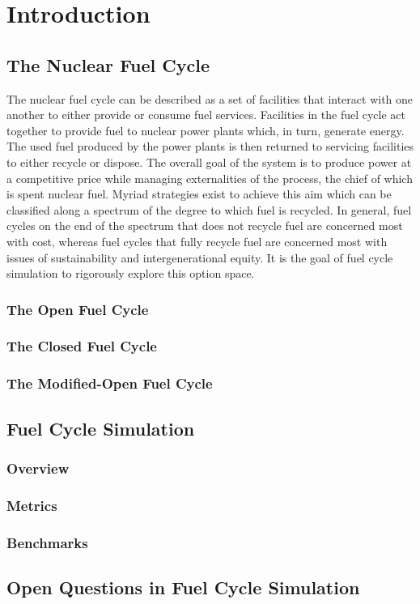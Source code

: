 \chapter{Introduction}\label{ch:intro}

\section{The Nuclear Fuel Cycle}

The nuclear fuel cycle can be described as a set of facilities that interact
with one another to either provide or consume fuel services. Facilities in the
fuel cycle act together to provide fuel to nuclear power plants which, in turn,
generate energy. The used fuel produced by the power plants is then returned to
servicing facilities to either recycle or dispose. The overall goal of the
system is to produce power at a competitive price while managing externalities
of the process, the chief of which is spent nuclear fuel. Myriad strategies
exist to achieve this aim which can be classified along a spectrum of the degree
to which fuel is recycled. In general, fuel cycles on the end of the spectrum
that does not recycle fuel are concerned most with cost, whereas fuel cycles
that fully recycle fuel are concerned most with issues of sustainability and
intergenerational equity. It is the goal of fuel cycle simulation to rigorously
explore this option space.

\subsection{The Open Fuel Cycle}


\subsection{The Closed Fuel Cycle}


\subsection{The Modified-Open Fuel Cycle}


\section{Fuel Cycle Simulation}

\subsection{Overview}\label{sec:simulators-overview}


\subsection{Metrics}


\subsection{Benchmarks}\label{sec:intro-benchmarks}


\section{Open Questions in Fuel Cycle Simulation}

